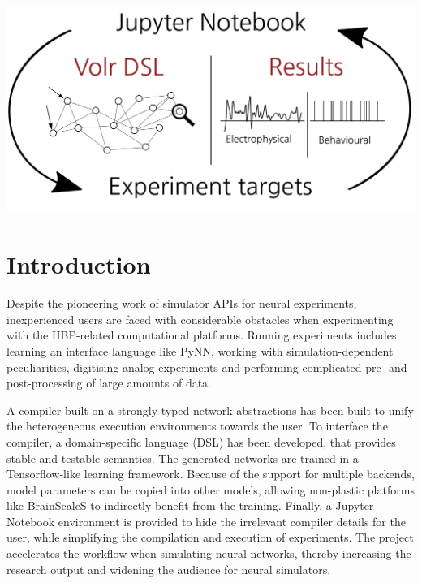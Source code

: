 \documentclass[a0,portrait]{a0poster}
\begin{document}
\begin{multicols}{2}
\begin{center}\vspace{0.3cm}
\includegraphics[width=0.9\linewidth]{figures/volr_model.png}
\label{fig:model}
\end{center}
\color{SaddleBrown} %
\section*{Introduction}
Despite the pioneering work of simulator APIs for neural experiments,
inexperienced users are faced with considerable obstacles when experimenting
with the HBP-related computational platforms.
Running experiments includes learning an interface language like 
PyNN, working with simulation-dependent peculiarities, digitising analog experiments
and performing complicated pre- and post-processing of large amounts of data.

A compiler built on a strongly-typed network abstractions has been built to
unify the heterogeneous execution environments towards the user. 
To interface the compiler, a domain-specific language (DSL) has been developed, 
that provides stable and testable semantics.
The generated networks are trained in a Tensorflow-like learning framework.
Because of the support for multiple backends, model parameters can be copied
into other models, allowing non-plastic platforms like BrainScaleS to indirectly
benefit from the training.
Finally, a Jupyter Notebook environment is provided to hide the irrelevant
compiler details for the user, while simplifying the compilation and execution of
experiments.
The project accelerates the workflow when simulating neural networks, thereby
increasing the research output and widening the audience for neural simulators. 


\end{multicols}
\end{document}
